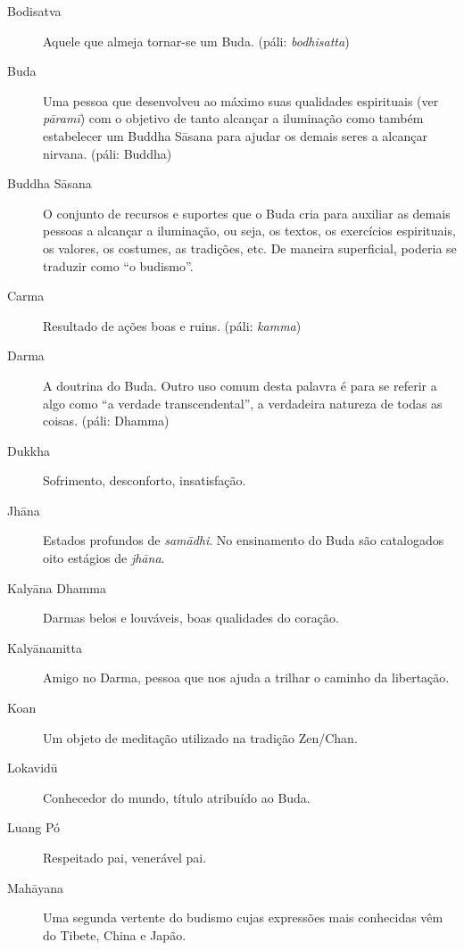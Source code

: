 \begin{description}
  \item[Bodisatva] Aquele que almeja tornar-se um Buda. (páli: \emph{bodhisatta})

  \item[Buda] Uma pessoa que desenvolveu ao máximo suas qualidades espirituais (ver \emph{pāramī}) com o objetivo de tanto alcançar a iluminação como também estabelecer um Buddha Sāsana para ajudar os demais seres a alcançar nirvana. (páli: Buddha)

  \item[Buddha Sāsana] O conjunto de recursos e suportes que o Buda cria para auxiliar as demais pessoas a alcançar a iluminação, ou seja, os textos, os exercícios espirituais, os valores, os costumes, as tradições, etc. De maneira superficial, poderia se traduzir como “o budismo”.

  \item[Carma] Resultado de ações boas e ruins. (páli: \emph{kamma})

  \item[Darma] A doutrina do Buda. Outro uso comum desta palavra é para se referir a algo como “a verdade transcendental”, a verdadeira natureza de todas as coisas. (páli: Dhamma)

  \item[Dukkha] Sofrimento, desconforto, insatisfação.

  \item[Jhāna] Estados profundos de \emph{samādhi}. No ensinamento do Buda são catalogados oito estágios de \emph{jhāna}.

  \item[Kalyāna Dhamma] Darmas belos e louváveis, boas qualidades do coração.

  \item[Kalyānamitta] Amigo no Darma, pessoa que nos ajuda a trilhar o caminho da libertação.

  \item[Koan] Um objeto de meditação utilizado na tradição Zen/Chan.

  \item[Lokavidū] Conhecedor do mundo, título atribuído ao Buda.

  \item[Luang Pó] Respeitado pai, venerável pai.

  \item[Mahāyana] Uma segunda vertente do budismo cujas expressões mais conhecidas vêm do Tibete, China e Japão.


\end{description}
